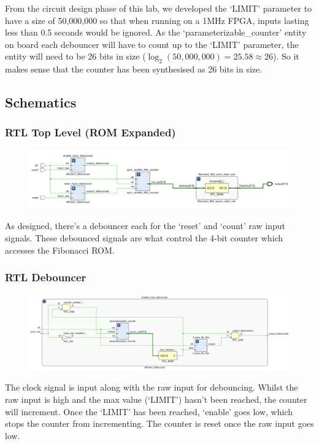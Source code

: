 \documentclass[11pt]{report}
\begin{document}
From the circuit design phase of this lab, we developed the `LIMIT' parameter to have a size of 50,000,000 so that when running on a 1MHz FPGA, inputs lasting less than 0.5 seconds would be ignored. As the `parameterizable\_counter' entity on board each debouncer will have to count up to the `LIMIT' parameter, the entity will need to be 26 bits in size ($\log_2(50,000,000)=25.58\approx26$). So it makes sense that the counter has been synthesised as 26 bits in size.



\subsection*{Schematics}


\subsubsection*{RTL Top Level (ROM Expanded)}
\begin{figure}[H]
    \includegraphics[width=\columnwidth]{Schematics/01_rtl-tl-rom-expanded.png}
\end{figure}
As designed, there's a debouncer each for the `reset' and `count' raw input signals. These debounced signals are what control the 4-bit counter which accesses the Fibonacci ROM.



\subsubsection*{RTL Debouncer}
\begin{figure}[H]
    \includegraphics[width=\columnwidth]{Schematics/02_rtl-debouncer.png}
\end{figure}
The clock signal is input along with the raw input for debouncing. Whilst the raw input is high and the max value (`LIMIT') hasn't been reached, the counter will increment. Once the `LIMIT' has been reached, `enable' goes low, which stops the counter from incrementing. The counter is reset once the raw input goes low.
\end{document}
